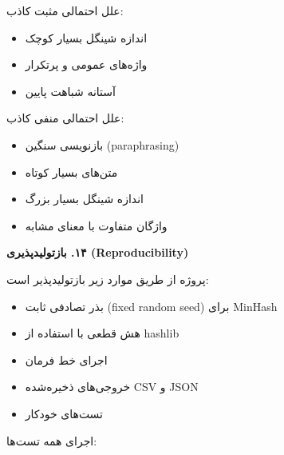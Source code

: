 \documentclass[11pt]{article}
\begin{document}
\noindent ‏علل احتمالی مثبت کاذب:\par

\begin{itemize}

\item ‏اندازه شینگل بسیار کوچک

\item ‏واژه‌های عمومی و پرتکرار

\item ‏آستانه شباهت پایین

\end{itemize}

\noindent ‏علل احتمالی منفی کاذب:\par

\begin{itemize}

\item ‏بازنویسی سنگین (paraphrasing)

\item ‏متن‌های بسیار کوتاه

\item ‏اندازه شینگل بسیار بزرگ

\item ‏واژگان متفاوت با معنای مشابه

\end{itemize}

\medskip\noindent\hrulefill\medskip

\medskip
{\large\bfseries ‏۱۴. بازتولیدپذیری (Reproducibility)}\medskip


\noindent ‏پروژه از طریق موارد زیر بازتولیدپذیر است:\par

\begin{itemize}

\item ‏بذر تصادفی ثابت (fixed random seed) برای MinHash

\item ‏هش قطعی با استفاده از hashlib

\item ‏اجرای خط فرمان

\item ‏خروجی‌های ذخیره‌شده CSV و JSON

\item ‏تست‌های خودکار

\end{itemize}

\noindent ‏اجرای همه تست‌ها:\par
\end{document}
